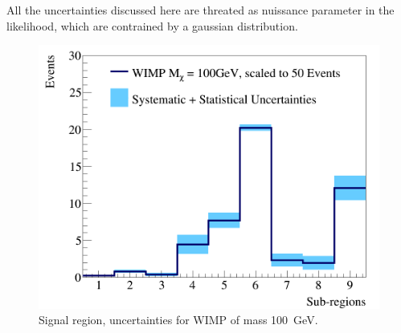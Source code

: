 All the uncertainties discussed here are threated as nuissance parameter in the likelihood, which are contrained by a gaussian distribution.

\begin{figure}[h]
  \includegraphics[width=\linewidth]{images/wimp_sys_unc.png}
  \caption{Signal region, uncertainties for WIMP of mass 100~GeV.}
  \label{fig:unc}
\end{figure}

















